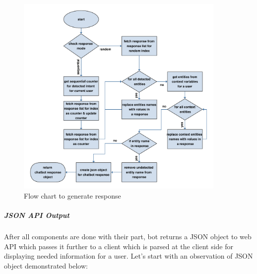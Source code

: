 \begin{figure}[H]
    \centering
    \includegraphics[width=0.9\textwidth]{img/Response_generator.pdf}
    \caption{Flow chart to generate response }
    \label{fig:flowRespGen}
\end{figure}

\subparagraph*{JSON API Output}
After all components are done with their part, bot returns a JSON object to web API which passes it further to a client which is parsed at the client side for displaying needed information for a user. Let's start with an observation of JSON object demonstrated below:

